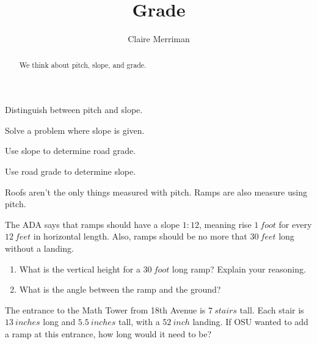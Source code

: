 \documentclass[noauthor,nooutcomes,hints,handout]{ximera}
\title{Grade}
\author{Claire Merriman}
\begin{document}
\begin{abstract}
  We think about pitch, slope, and grade.
\end{abstract}
\maketitle

\begin{listOutcomes}
\item Distinguish between pitch and slope.
\item Solve a problem where slope is given.
\item Use slope to determine road grade.
\item Use road grade to determine slope.
\end{listOutcomes}


\begin{question}
  Roofs aren't the only things measured with pitch. Ramps are also measure using pitch. 
  
  The ADA says that ramps should have a slope $1:12$, meaning rise $1 \ foot$ for every $12\ feet$ in horizontal length. Also, ramps should be no more that $30\ feet$ long without a landing. 
  
  
\begin{enumerate}
 \item What is the vertical height for a $30\ foot$ long ramp? Explain your reasoning. 
 \item What is the angle between the ramp and the ground?
\end{enumerate}

\end{question}

\mynewpage

\begin{question}
The entrance to the Math Tower from 18th Avenue is $7\ stairs$ tall. Each stair is $13\ inches$ long and $5.5\ inches$ tall, with a $52\ inch$ landing. If OSU wanted to add a ramp at this entrance, how long would it need to be?

  \end{question}
\mynewpage
\end{document}
